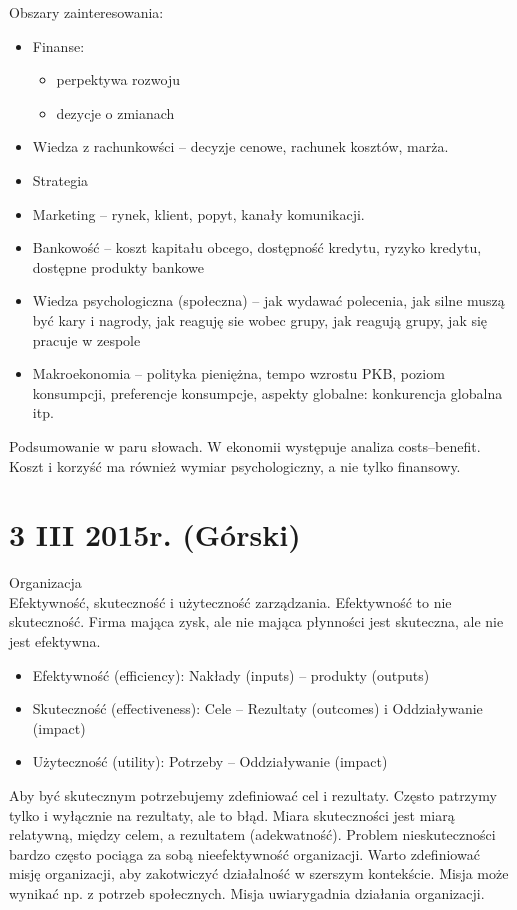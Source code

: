 \documentclass[a4paper,10pt]{report}
\begin{document}
Obszary zainteresowania:
\begin{itemize}
	\item Finanse:
	\begin{itemize}
		\item perpektywa rozwoju
		\item dezycje o zmianach
	\end{itemize}
	\item Wiedza z rachunkowści -- decyzje cenowe, rachunek kosztów, marża.
	\item Strategia
	\item Marketing -- rynek, klient, popyt, kanały komunikacji.
	\item Bankowość -- koszt kapitału obcego, dostępność kredytu, ryzyko kredytu, dostępne produkty bankowe
	\item Wiedza psychologiczna (społeczna) -- jak wydawać polecenia, jak silne muszą być kary i nagrody, jak reaguję sie wobec grupy, jak reagują grupy, jak się pracuje w zespole
	\item Makroekonomia -- polityka pieniężna, tempo wzrostu PKB, poziom konsumpcji, preferencje konsumpcje, aspekty globalne: konkurencja globalna itp.
\end{itemize}

Podsumowanie w paru słowach. 
W ekonomii występuje analiza costs--benefit. Koszt i korzyść ma również wymiar psychologiczny, a nie tylko finansowy. 


\section{3 III 2015r. (Górski)}

Organizacja \\

Efektywność, skuteczność i użyteczność zarządzania. Efektywność to nie skuteczność. Firma mająca zysk, ale nie mająca płynności jest skuteczna, ale nie jest efektywna. \\
\begin{itemize}
	\item Efektywność (efficiency): Nakłady (inputs) -- produkty (outputs)
	\item Skuteczność (effectiveness): Cele -- Rezultaty (outcomes) i Oddziaływanie (impact)
	\item Użyteczność (utility): Potrzeby -- Oddziaływanie (impact)
\end{itemize}

\indent Aby być skutecznym potrzebujemy zdefiniować cel i rezultaty. Często patrzymy tylko i wyłącznie na rezultaty, ale to błąd. Miara skuteczności jest miarą relatywną, między celem, a rezultatem (adekwatność). Problem nieskuteczności bardzo często pociąga za sobą nieefektywność organizacji. Warto zdefiniować misję organizacji, aby zakotwiczyć działalność w szerszym kontekście. Misja może wynikać np. z potrzeb społecznych. Misja uwiarygadnia działania organizacji. \\
\end{document}

